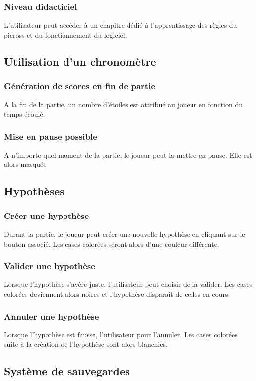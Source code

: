 \documentclass{report}
\begin{document}
		\subsubsection{Niveau didacticiel}
				L'utilisateur peut accéder à un chapitre dédié à l'apprentissage des règles du picross et du fonctionnement du logiciel.

    \subsection{Utilisation d'un chronomètre}
			\subsubsection{Génération de scores en fin de partie}
				A la fin de la partie, un nombre d'étoiles est attribué au joueur en fonction du temps écoulé.
			\subsubsection{Mise en pause possible}
				A n'importe quel moment de la partie, le joueur peut la mettre en pause. Elle est alors masquée
	
	\subsection{Hypothèses}
		\subsubsection{Créer une hypothèse}
			Durant la partie, le joueur peut créer une nouvelle hypothèse en cliquant sur le bouton associé. Les cases colorées seront alors d'une couleur différente.
		\subsubsection{Valider une hypothèse}
			Lorsque l'hypothèse s'avère juste, l'utilisateur peut choisir de la valider. Les cases colorées deviennent alors noires et l'hypothèse disparait de celles en cours.
		\subsubsection{Annuler une hypothèse}
			Lorsque l'hypothèse est fausse, l'utilisateur pour l'annuler. Les cases colorées suite à la création de l'hypothèse sont alors blanchies.
		
	\subsection{Système de sauvegardes}
\end{document}
